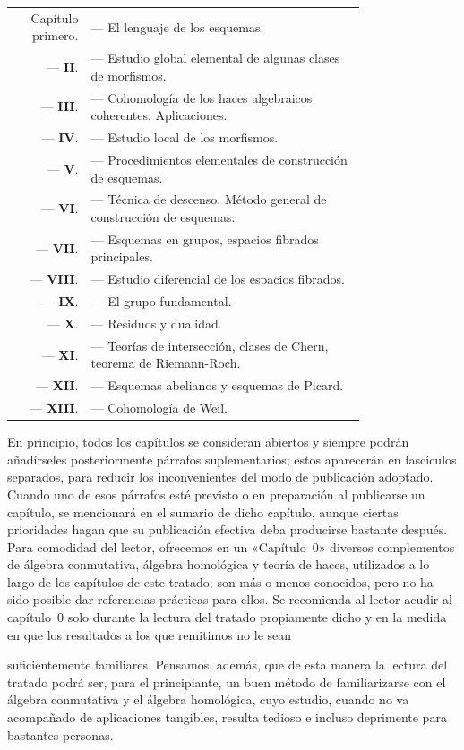 \medskip
\begin{tabular}{r p{0.78\linewidth}}
  Capítulo primero. & --- El lenguaje de los esquemas.\\
  --- \textbf{II}. & --- Estudio global elemental de algunas clases de morfismos.\\
  --- \textbf{III}. & --- Cohomología de los haces algebraicos coherentes. Aplicaciones.\\
  --- \textbf{IV}. & --- Estudio local de los morfismos.\\
  --- \textbf{V}. & --- Procedimientos elementales de construcción de esquemas.\\
  --- \textbf{VI}. & --- Técnica de descenso. Método general de construcción de esquemas.\\
  --- \textbf{VII}. & --- Esquemas en grupos, espacios fibrados principales.\\
  --- \textbf{VIII}. & --- Estudio diferencial de los espacios fibrados.\\
  --- \textbf{IX}. & --- El grupo fundamental.\\
  --- \textbf{X}. & --- Residuos y dualidad.\\
  --- \textbf{XI}. & --- Teorías de intersección, clases de Chern, teorema de Riemann-Roch.\\
  --- \textbf{XII}. & --- Esquemas abelianos y esquemas de Picard.\\
  --- \textbf{XIII}. & --- Cohomología de Weil.\\
\end{tabular}
\medskip

En principio, todos los capítulos se consideran abiertos y siempre podrán añadírseles posteriormente párrafos suplementarios; estos aparecerán en fascículos separados, para reducir los inconvenientes del modo de publicación adoptado.
Cuando uno de esos párrafos esté previsto o en preparación al publicarse un capítulo, se mencionará en el sumario de dicho capítulo, aunque ciertas prioridades hagan que su publicación efectiva deba producirse bastante después.
Para comodidad del lector, ofrecemos en un «Capítulo~0» diversos complementos de álgebra conmutativa, álgebra homológica y teoría de haces, utilizados a lo largo de los capítulos de este tratado; son más o menos conocidos, pero no ha sido posible dar referencias prácticas para ellos.
Se recomienda al lector acudir al capítulo~0 solo durante la lectura del tratado propiamente dicho y en la medida en que los resultados a los que remitimos no le sean

suficientemente familiares.
Pensamos, además, que de esta manera la lectura del tratado podrá ser, para el principiante, un buen método de familiarizarse con el álgebra conmutativa y el álgebra homológica, cuyo estudio, cuando no va acompañado de aplicaciones tangibles, resulta tedioso e incluso deprimente para bastantes personas.

